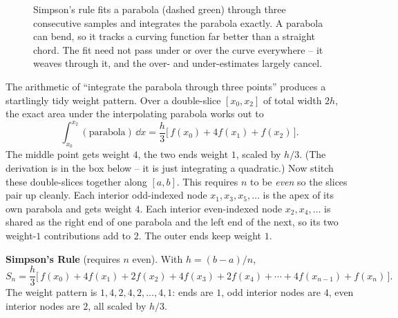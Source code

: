 \begin{figure}[H]
\centering
{}
\caption{Simpson's rule fits a parabola (dashed green) through three consecutive samples and integrates the parabola exactly. A parabola can bend, so it tracks a curving function far better than a straight chord. The fit need not pass under or over the curve everywhere -- it weaves through it, and the over- and under-estimates largely cancel.}
\label{ch27:fig-simp}
\end{figure}

The arithmetic of ``integrate the parabola through three points'' produces a startlingly tidy weight pattern. Over a double-slice $[x_0, x_2]$ of total width $2h$, the exact area under the interpolating parabola works out to
\[
\int_{x_0}^{x_2} (\text{parabola})\,\dd x = \frac{h}{3}\Big[\,f(x_0) + 4 f(x_1) + f(x_2)\,\Big].
\]
The middle point gets weight $4$, the two ends weight $1$, scaled by $h/3$. (The derivation is in the box below -- it is just integrating a quadratic.) Now stitch these double-slices together along $[a,b]$. This requires $n$ to be \emph{even} so the slices pair up cleanly. Each interior odd-indexed node $x_1, x_3, x_5, \dots$ is the apex of its own parabola and gets weight $4$. Each interior even-indexed node $x_2, x_4, \dots$ is shared as the right end of one parabola and the left end of the next, so its two weight-$1$ contributions add to $2$. The outer ends keep weight $1$.

\begin{focusbox}
\textbf{Simpson's Rule} (requires $n$ even). With $h = (b-a)/n$,
\[
S_n = \frac{h}{3}\Big[\, f(x_0) + 4f(x_1) + 2f(x_2) + 4f(x_3) + 2f(x_4) + \cdots + 4f(x_{n-1}) + f(x_n)\,\Big].
\]
The weight pattern is $1,4,2,4,2,\dots,4,1$: ends are $1$, odd interior nodes are $4$, even interior nodes are $2$, all scaled by $h/3$.
\end{focusbox}

